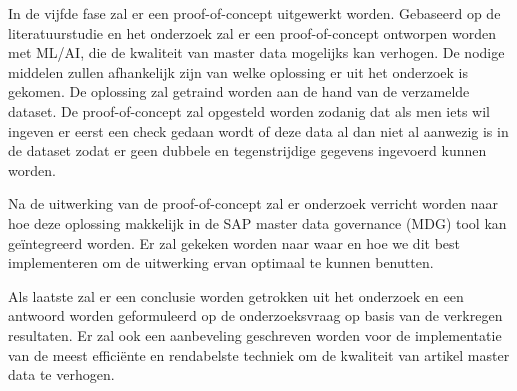 In de vijfde fase zal er een proof-of-concept uitgewerkt worden. Gebaseerd op de literatuurstudie en het onderzoek zal er een proof-of-concept ontworpen worden met ML/AI, die de kwaliteit van master data mogelijks kan verhogen. De nodige middelen zullen afhankelijk zijn van welke oplossing er uit het onderzoek is gekomen. De oplossing zal getraind worden aan de hand van de verzamelde dataset. De proof-of-concept zal opgesteld worden zodanig dat als men iets wil ingeven er eerst een check gedaan wordt of deze data al dan niet al aanwezig is in de dataset zodat er geen dubbele en tegenstrijdige gegevens ingevoerd kunnen worden.

Na de uitwerking van de proof-of-concept zal er onderzoek verricht worden naar hoe deze oplossing makkelijk in de SAP master data governance (MDG) tool kan geïntegreerd worden. Er zal gekeken worden naar waar en hoe we dit best implementeren om de uitwerking ervan optimaal te kunnen benutten.

Als laatste zal er een conclusie worden getrokken uit het onderzoek en een antwoord worden geformuleerd op de onderzoeksvraag op basis van de verkregen resultaten. Er zal ook een aanbeveling geschreven worden voor de implementatie van de meest efficiënte en rendabelste techniek om de kwaliteit van artikel master data te verhogen. 

